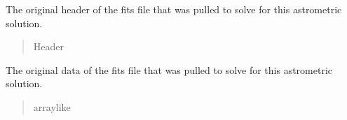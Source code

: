 \documentclass[letterpaper,11pt,english]{sphinxmanual}
\begin{document}
\begin{savenotes}
\begin{fulllineitems}

\begin{savenotes}\begin{fulllineitems}
\label{\detokenize{code/opihiexarata.astrometry.solution:opihiexarata.astrometry.solution.AstrometricSolution._original_header}}
\pysigstartsignatures
{}
\pysigstopsignatures
\sphinxAtStartPar
The original header of the fits file that was pulled to solve for this
astrometric solution.
\begin{quote}\begin{description}
\sphinxAtStartPar
Header

\end{description}\end{quote}

\end{fulllineitems}\end{savenotes}


\begin{savenotes}\begin{fulllineitems}
\label{\detokenize{code/opihiexarata.astrometry.solution:opihiexarata.astrometry.solution.AstrometricSolution._original_data}}
\pysigstartsignatures
{}
\pysigstopsignatures
\sphinxAtStartPar
The original data of the fits file that was pulled to solve for this
astrometric solution.
\begin{quote}\begin{description}
\sphinxAtStartPar
array\sphinxhyphen{}like

\end{description}\end{quote}

\end{fulllineitems}\end{savenotes}



\end{fulllineitems}
\end{savenotes}
\end{document}
